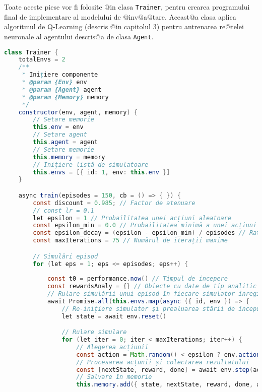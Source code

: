 Toate aceste piese vor fi folosite @in clasa \texttt{Trainer}, pentru crearea programului final de implementare al modelului de @inv@a@tare. Aceast@a clasa aplica algoritmul de Q-Learning (descris @in capitolul 3) pentru antrenarea re@telei neuronale al agentului descris@a de clasa \texttt{Agent}.

\begin{lstlisting}[language=Java, caption={Structura clasei Trainer}]
class Trainer {
    totalEnvs = 2
    /**
     * Inițiere componente
     * @param {Env} env 
     * @param {Agent} agent 
     * @param {Memory} memory
     */
    constructor(env, agent, memory) {
        // Setare memorie
        this.env = env
        // Setare agent
        this.agent = agent
        // Setare memorie
        this.memory = memory
        // Inițiere listă de simulatoare
        this.envs = [{ id: 1, env: this.env }]
    }

    async train(episodes = 150, cb = () => { }) {
        const discount = 0.985; // Factor de atenuare
        // const lr = 0.1
        let epsilon = 1 // Probailitatea unei acțiuni aleatoare
        const epsilon_min = 0.0 // Probailitatea minimă a unei acțiuni aleatoare
        const epsilon_decay = (epsilon - epsilon_min) / episodes // Rata de scădere a probabilității
        const maxIterations = 75 // Numărul de iterații maxime

        // Simulări episod
        for (let eps = 1; eps <= episodes; eps++) {
        
            const t0 = performance.now() // Timpul de incepere
            const rewardsAnaly = {} // Obiecte cu date de tip analitic
            // Rulare simulării unui episod în fiecare simulator înregistrat în listă
            await Promise.all(this.envs.map(async ({ id, env }) => {
                // Re-inițiere simulator și prealuarea stării de început
                let state = await env.reset()

                // Rulare simulare
                for (let iter = 0; iter < maxIterations; iter++) {
                    // Alegerea acțiunii
                    const action = Math.random() < epsilon ? env.actionSample() : this.agent.getAction(state)
                    // Procesarea acțunii și colectarea rezultatului
                    const [nextState, reward, done] = await env.step(action)
                    // Salvare în memorie
                    this.memory.add({ state, nextState, reward, done, action })


\end{lstlisting}
